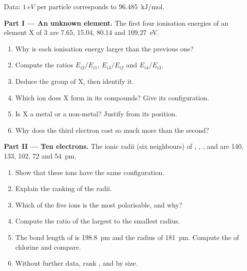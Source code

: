 \begin{problem}
\label{pb:b1:periodicity:1}
Data: $\qty{1}{eV}$ per particle corresponds to \qty{96.485}{kJ/mol}.

\medskip
\noindent\textbf{Part I --- An unknown element.}
The first four ionisation energies of an element X of  3 are 7.65,
15.04, 80.14 and \qty{109.27}{eV}.
\begin{enumerate}
  \item Why is each ionisation energy larger than the previous one?
  \item Compute the ratios $E_{i2}/E_{i1}$, $E_{i3}/E_{i2}$ and
        $E_{i4}/E_{i3}$.
  \item Deduce the group of X, then identify it.
  \item Which ion does X form in its compounds? Give its configuration.
  \item Is X a metal or a non-metal? Justify from its position.
  \item Why does the third electron cost so much more than the second?
\end{enumerate}

\medskip
\noindent\textbf{Part II --- Ten electrons.}
The ionic radii (six neighbours) of , , ,
 and  are 140, 133, 102, 72 and \qty{54}{pm}.
\begin{enumerate}[resume]
  \item Show that these ions have the same configuration.
  \item Explain the ranking of the radii.
  \item Which of the five ions is the most polarisable, and why?
  \item Compute the ratio of the largest to the smallest radius.
  \item The bond length of  is \qty{198.8}{pm} and the radius of
         \qty{181}{pm}. Compute the  of chlorine
        and compare.
  \item Without further data, rank ,  and 
        by size.
\end{enumerate}


\end{problem}
